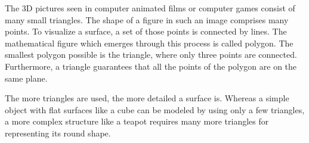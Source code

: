
The 3D pictures seen in computer animated films or computer games consist of many small triangles. The shape of a figure in such an image comprises many points. To visualize a surface, a set of those points is connected by lines. The mathematical figure which emerges through this process is called polygon. The smallest polygon possible is the triangle, where only three points are connected. Furthermore, a triangle guarantees that all the points of the polygon are on the same plane.

The more triangles are used, the more detailed a surface is. Whereas a simple object with flat surfaces like a cube can be modeled by using only a few triangles, a more complex structure like a teapot requires many more triangles for representing its round shape.

